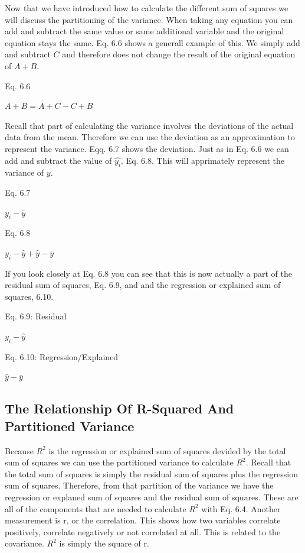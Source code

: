 \documentclass[]{book}
\theoremstyle{definition}
\theoremstyle{definition}
\theoremstyle{definition}
\theoremstyle{remark}
\begin{document}
Now that we have introduced how to calculate the different sum of
squares we will discuss the partitioning of the variance. When taking
any equation you can add and subtract the same value or same additional
variable and the original equation stays the same. Eq. 6.6 shows a
generall example of this. We simply add and subtract \(C\) and therefore
does not change the result of the original equation of \(A + B\).

Eq. 6.6

\(A + B = A + C - C + B\)

Recall that part of calculating the variance involves the deviations of
the actual data from the mean. Therefore we can use the deviation as an
approximation to represent the variance. Eqq. 6.7 shows the deviation.
Just as in Eq. 6.6 we can add and subtract the value of \(\hat{y_i}\).
Eq. 6.8. This will apprimately represent the variance of \(y\).

Eq. 6.7

\(y_i - \bar{y}\)

Eq. 6.8

\(y_i - \hat{y} + \hat{y} - \bar{y}\)

If you look closely at Eq. 6.8 you can see that this is now actually a
part of the residual sum of squares, Eq. 6.9, and and the regression or
explained sum of squares, 6.10.

Eq. 6.9: Residual

\(y_i - \hat{y}\)

Eq. 6.10: Regression/Explained

\(\hat{y} - \bar{y}\)

\hypertarget{the-relationship-of-r-squared-and-partitioned-variance}{%
\subsection{The Relationship Of R-Squared And Partitioned
Variance}\label{the-relationship-of-r-squared-and-partitioned-variance}}

Because \(R^2\) is the regression or explained sum of squares devided by
the total sum of squares we can use the partitioned variance to
calculate \(R^2\). Recall that the total sum of squares is simply the
residual sum of squares plus the regression sum of squares. Therefore,
from that partition of the variance we have the regression or explaned
sum of squares and the residual sum of squares. These are all of the
components that are needed to calculate \(R^2\) with Eq. 6.4. Another
measurement is r, or the correlation. This shows how two variables
correlate positively, correlate negatively or not correlated at all.
This is related to the covariance. \(R^2\) is simply the square of r.
\end{document}

